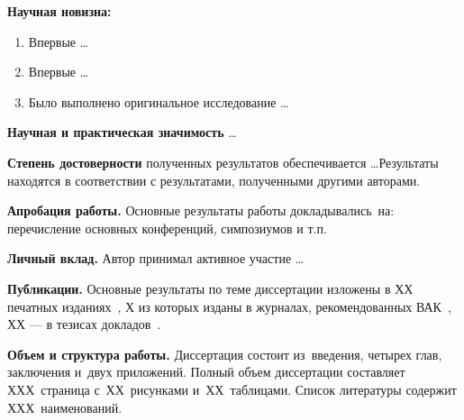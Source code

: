 \textbf{Научная новизна:}
\begin{enumerate}
  \item Впервые \ldots
  \item Впервые \ldots
  \item Было выполнено оригинальное исследование \ldots
\end{enumerate}

\textbf{Научная и практическая значимость} \ldots

\textbf{Степень достоверности} полученных результатов обеспечивается \ldots Результаты находятся в соответствии с результатами, полученными другими авторами.

\textbf{Апробация работы.}
Основные результаты работы докладывались~на:
перечисление основных конференций, симпозиумов и т.п.

\textbf{Личный вклад.} Автор принимал активное участие \ldots

\textbf{Публикации.} Основные результаты по теме диссертации изложены в ХХ печатных изданиях~\cite{bib1,bib2,bib3,bib4,bib5},
Х из которых изданы в журналах, рекомендованных ВАК~\cite{bib1,bib2,bib3}, 
ХХ --- в тезисах докладов~\cite{bib4,bib5}.

\textbf{Объем и структура работы.} Диссертация состоит из~введения, четырех глав, заключения и~двух приложений. Полный объем диссертации составляет ХХХ~страница с~ХХ~рисунками и~ХХ~таблицами. Список литературы содержит ХХХ~наименований.

\clearpage